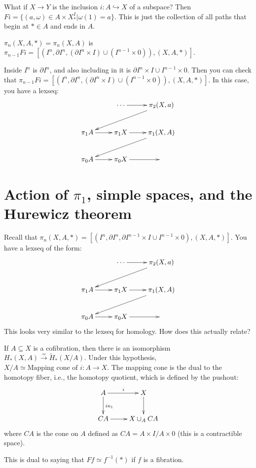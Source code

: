 What if $X\to Y$ is the inclusion $i:A\hookrightarrow X$ of a subspace? Then $Fi=\{(a,\omega)\in A\times X^I_\ast|\omega(1) = a\}$. This is just the collection of all paths that begin at $\ast\in A$ and ends in $A$.
\begin{definition}
    $\pi_n(X,A,\ast) = \pi_n(X,A)$ is $\pi_{n-1}Fi = [(I^n,\partial I^n,(\partial I^n\times I)\cup (I^{n-1}\times 0)),(X,A,\ast)]$.
\end{definition}
Inside $I^n$ is $\partial I^n$, and also including in it is $\partial I^n\times I\cup I^{n-1}\times 0$. Then you can check that $\pi_{n-1}Fi = [(I^n,\partial I^n,(\partial I^n\times I)\cup (I^{n-1}\times 0)),(X,A,\ast)]$. In this case, you have a lexseq: 
\begin{equation*}
    \xymatrix{
	& \cdots\ar[r] & \pi_2 (X,a)\ar[dll]\\
	\pi_1 A\ar[r] & \pi_1 X\ar[r] & \pi_1 (X,A)\ar[dll]\\
	\pi_0 A\ar[r] & \pi_0 X\ar[r] & 
    }
\end{equation*}
\chapter{Action of $\pi_1$, simple spaces, and the Hurewicz theorem}
Recall that $\pi_n(X,A,\ast) = [(I^n,\partial I^n,\partial I^{n-1}\times I\cup I^{n-1}\times 0),(X,A,\ast)]$. You have a lexseq of the form:
\begin{equation*}
    \xymatrix{
	& \cdots\ar[r] & \pi_2 (X,a)\ar[dll]\\
	\pi_1 A\ar[r] & \pi_1 X\ar[r] & \pi_1 (X,A)\ar[dll]\\
	\pi_0 A\ar[r] & \pi_0 X\ar[r] & 
    }
\end{equation*}
This looks very similar to the lexseq for homology. How does this actually relate?
\begin{lemma}[Excision]
    If $A\subseteq X$ is a cofibration, then there is an isomorphism $H_\ast(X,A)\xrightarrow{\simeq}\widetilde{H}_\ast(X/A)$. Under this hypothesis, $X/A\simeq\text{Mapping cone of }i:A\to X$. The mapping cone is the dual to the homotopy fiber, i.e., the homotopy quotient, which is defined by the pushout:
    \begin{equation*}
	\xymatrix{
	    A\ar[r]^i\ar[d]^{in_1} & X\ar[d]\\
	    CA\ar[r] & X\cup_A CA
	    }
    \end{equation*}
    where $CA$ is the cone on $A$ defined as $CA = A\times I/A\times 0$ (this is a contractible space).
\end{lemma}
This is dual to saying that $Ff\simeq f^{-1}(\ast)$ if $f$ is a fibration.

